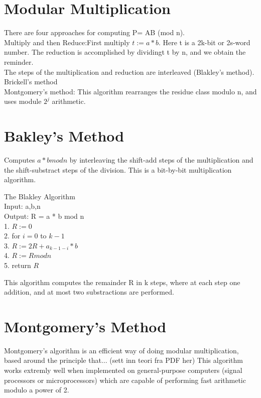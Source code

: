 \section{Modular Multiplication}
There are four approaches for computing P= AB (mod n).\\
Multiply and then Reduce:First multiply $t:=a*b$. Here t is a 2k-bit or 2s-word number. The reduction is accomplished by dividingt t by n, and we obtain the reminder.\\
The steps of the multiplication and reduction are interleaved (Blakley's method).\\
Brickell's method\\
Montgomery's method: This algorithm rearranges the residue class modulo n, and uses module $2^j$ arithmetic.\\

\section{Bakley's Method}
Computes $a*b mod n$ by interleaving the shift-add steps of the multiplication and the shift-substract steps of the division. This is a bit-by-bit multiplication algorithm.

\begin{algorithm}
The Blakley Algorithm\\
Input: a,b,n\\
Output: R = a * b mod n\\
1. $R:= 0$\\
2. for $i=0$ to $k-1$ \\
3. $R:=2R + a_{k-1-i}*b$\\
4. $R:= R mod n$\\
5. return $R$
\end{algorithm}

This algorithm computes the remainder R in k steps, where at each step one addition, and at most two substractions are performed.


\section{Montgomery's Method}
Montgomery's algorithm is an efficient way of doing modular multiplication, based around the principle that... (sett inn teori fra PDF her)
This algorithm works extremly well when implemented on general-purpose computers (signal processors or microprocessors) which are capable of performing fast arithmetic modulo a power of 2. 

